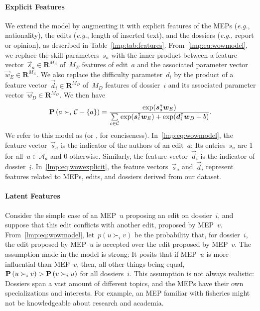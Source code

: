 \paragraph{Explicit Features}

We extend the \wow{} model by augmenting it with explicit features of the MEPs (\textit{e.g.}, nationality), the edits (\textit{e.g.}, length of inserted text), and the dossiers (\textit{e.g.}, report or opinion), as described in Table~\ref{lmp:tab:features}.
From~\eqref{lmp:eq:wowmodel}, we replace the skill parameters~$s_a$ with the inner product between a feature vector~$\vec{s}_a \in \mathbf{R}^{M_E}$ of~$M_E$ features of edit~$a$ and the associated parameter vector~$\vec{w}_E \in \mathbf{R}^{M_E}$.
We also replace the difficulty parameter~$d_i$ by the product of a feature vector~$\vec{d}_i \in \mathbf{R}^{M_D}$ of~$M_D$ features of dossier~$i$ and its associated parameter vector~$\vec{w}_D \in \mathbf{R}^{M_D}$.
We then have
\begin{equation}
	\label{lmp:eq:wowexplicit}
	\mathbf{P}\left(  a \succ_i \mathcal{C} - \{ a\}  \right) =
	\frac{\exp(\boldsymbol{s}_a^\intercal \boldsymbol{w}_E) }{ \sum\limits_{c \in \mathcal{C} } \exp(\boldsymbol{s}_c^\intercal \boldsymbol{w}_E) + \exp(\boldsymbol{d}_i ^\intercal \boldsymbol{w}_D + b) }.
\end{equation}
We refer to this model as  (or , for conciseness).
In~\eqref{lmp:eq:wowmodel}, the feature vector~$\vec{s}_a$ is the indicator of the authors of an edit~$a$:
Its entries~$s_u$ are 1 for all~$u \in \mathcal{A}_a$ and 0 otherwise.
Similarly, the feature vector~$\vec{d}_i$ is the indicator of dossier~$i$.
In~\eqref{lmp:eq:wowexplicit}, the feature vectors~$\vec{s}_a$ and~$\vec{d}_i$ represent features related to MEPs, edits, and dossiers derived from our dataset.

\paragraph{Latent Features}

Consider the simple case of an MEP~$u$ proposing an edit on dossier~$i$, and suppose that this edit conflicts with another edit, proposed by MEP~$v$.
From~\eqref{lmp:eq:wowmodel}, let~$p( u \succ_i v)$ be the probability that, for dossier~$i$, the edit proposed by MEP~$u$ is accepted over the edit proposed by MEP~$v$.
The assumption made in the \wow{} model is strong:
It posits that if MEP~$u$ is more influential than MEP~$v$, then, all other things being equal,~$\mathbf{P}\left( u \succ_i v \right) > \mathbf{P}\left( v \succ_i u \right)$ for all dossiers~$i$.
This assumption is not always realistic:
Dossiers span a vast amount of different topics, and the MEPs have their own specializations and interests.
For example, an MEP familiar with fisheries might not be knowledgeable about research and academia.

